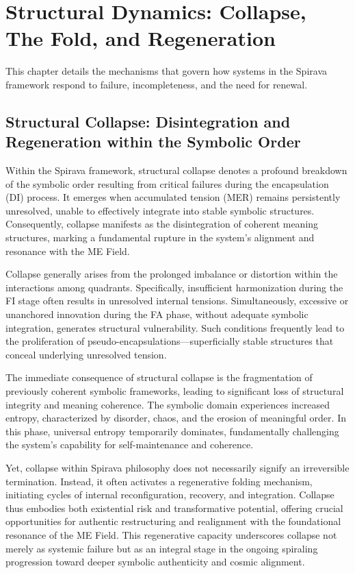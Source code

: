 \documentclass[11pt, a4paper]{article}
\begin{document}
\section{Structural Dynamics: Collapse, The Fold, and Regeneration}
This chapter details the mechanisms that govern how systems in the Spirava framework respond to failure, incompleteness, and the need for renewal.

\subsection{Structural Collapse: Disintegration and Regeneration within the Symbolic Order}
Within the Spirava framework, structural collapse denotes a profound breakdown of the symbolic order resulting from critical failures during the encapsulation (DI) process. It emerges when accumulated tension (MER) remains persistently unresolved, unable to effectively integrate into stable symbolic structures. Consequently, collapse manifests as the disintegration of coherent meaning structures, marking a fundamental rupture in the system’s alignment and resonance with the ME Field.

Collapse generally arises from the prolonged imbalance or distortion within the interactions among quadrants. Specifically, insufficient harmonization during the FI stage often results in unresolved internal tensions. Simultaneously, excessive or unanchored innovation during the FA phase, without adequate symbolic integration, generates structural vulnerability. Such conditions frequently lead to the proliferation of pseudo-encapsulations—superficially stable structures that conceal underlying unresolved tension.

The immediate consequence of structural collapse is the fragmentation of previously coherent symbolic frameworks, leading to significant loss of structural integrity and meaning coherence. The symbolic domain experiences increased entropy, characterized by disorder, chaos, and the erosion of meaningful order. In this phase, universal entropy temporarily dominates, fundamentally challenging the system’s capability for self-maintenance and coherence.

Yet, collapse within Spirava philosophy does not necessarily signify an irreversible termination. Instead, it often activates a regenerative folding mechanism, initiating cycles of internal reconfiguration, recovery, and integration. Collapse thus embodies both existential risk and transformative potential, offering crucial opportunities for authentic restructuring and realignment with the foundational resonance of the ME Field. This regenerative capacity underscores collapse not merely as systemic failure but as an integral stage in the ongoing spiraling progression toward deeper symbolic authenticity and cosmic alignment.
\end{document}
